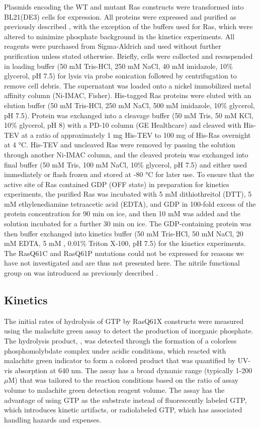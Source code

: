 Plasmids encoding the WT and mutant Ras constructs were transformed into BL21(DE3) cells for expression. 
All proteins were expressed and purified as previously described \cite{Stafford2012, Kapust2001, Stafford2010}, with the exception of the buffers used for Ras, which were altered to minimize phosphate background in the kinetics experiments. 
All reagents were purchased from Sigma-Aldrich and used without further purification unless stated otherwise. 
Briefly, cells were collected and resuspended in loading buffer (50 mM Tris-HCl, 250 mM NaCl, 40 mM imidazole, 10\% glycerol, pH 7.5) for lysis via probe sonication followed by centrifugation to remove cell debris. 
The supernatant was loaded onto a nickel immobilized metal affinity column (Ni-IMAC, Fisher). 
His-tagged Ras proteins were eluted with an elution buffer (50 mM Tris-HCl, 250 mM NaCl, 500 mM imidazole, 10\% glycerol, pH 7.5). 
Protein was exchanged into a cleavage buffer (50 mM Tris, 50 mM KCl, 10\% glycerol, pH 8) with a PD-10 column (GE Healthcare) and cleaved with His-TEV at a ratio of approximately 1 mg His-TEV to 100 mg of His-Ras overnight at 4 \si{\celsius}. His-TEV and uncleaved Ras were removed by passing the solution through another Ni-IMAC column, and the cleaved protein was exchanged into final buffer (50 mM Tris, 100 mM NaCl, 10\% glycerol, pH 7.5) and either used immediately or flash frozen and stored at -80 \si{\celsius} for later use. 
To ensure that the active site of Ras contained GDP (OFF state) in preparation for kinetics experiments, the purified Ras was incubated with 5 mM dithiothreitol (DTT), 5 mM ethylenediamine tetraacetic acid (EDTA), and GDP in 100-fold excess of the protein concentration for 90 min on ice, and then 10 mM  was added and the solution incubated for a further 30 min on ice. 
The GDP-containing protein was then buffer exchanged into kinetics buffer (50 mM Tris-HCl, 50 mM NaCl, 20 mM EDTA, 5 mM , 0.01\% Triton X-100, pH 7.5) for the kinetics experiments. 
The RasQ61C and RasQ61P mutations could not be expressed for reasons we have not investigated and are thus not presented here. 
The nitrile functional group on \RalB{} was introduced as previously described \cite{Stafford2010}.

\subsection{Kinetics}

The initial rates of hydrolysis of GTP by RasQ61X constructs were measured using the malachite green assay\cite{Quan2005, Hohenwallner1973, Lanzetta1979} to detect the production of inorganic phosphate. 
The hydrolysis product, , was detected through the formation of a colorless phosphomolybdate complex under acidic conditions, which reacted with malachite green indicator to form a colored product that was quantified by UV-vis absorption at 640 nm. 
The assay has a broad dynamic range (typically 1-200 $\mu$M) that was tailored to the reaction conditions based on the ratio of assay volume to malachite green detection reagent volume. 
The assay has the advantage of using GTP as the substrate instead of fluorescently labeled GTP, which introduces kinetic artifacts, or radiolabeled GTP, which has associated handling hazards and expenses.

